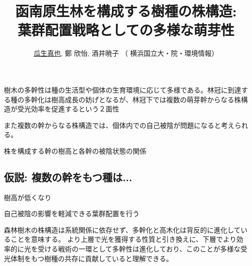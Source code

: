 \documentclass[a0, 36pt, plainboxedsections]{sciposter} %
\title{\textcolor{Orange1}{函南原生林を構成する樹種の株構造:\\葉群配置戦略としての多様な萌芽性}}
\author{\faUser \hspace{0.02em} \underline{瓜生真也}, 鄭 欣怡, 酒井暁子 （\faUniv \hspace{0.02em} 横浜国立大・院・環境情報） \normalsize{\faEnvelope \hspace{0.02em} \textit{\fontspec{ComicSansMS}{suika1127@gmail.com}}}}
\begin{document}
\maketitle
\begin{multicols}{2}

\begin{mdframed}[style=section.frame]
  \centering\huge\textbf{}
\end{mdframed}

樹木の多幹性は種の生活型や個体の生育環境に応じて多様である。林冠に到達する種の多幹化は樹高成長の妨げとなるが、林冠下では複数の萌芽幹からなる株構造が受光効率を促進するという２面性

また複数の幹からなる株構造では、個体内での自己被陰が問題になると考えられる。

株を構成する幹の樹高と各幹の被陰状態の関係

\subsection*{仮説: 複数の幹をもつ種は...}

\begin{list}{}{\setlength{\itemindent}{1em}} %
 \item 樹高が低くなり
 \item 自己被陰の影響を軽減できる葉群配置を行う
\end{list}

\begin{mdframed}[style=conclusion.frame]
  \centering\huge\textbf{}
  
  \flushleft\normalsize{
  森林樹木の株構造は系統関係に依存せず、多幹化と高木化は背反的に進化していることを意味する。
  より上層で光を獲得する性質と引き換えに、下層でより効率的に光を受ける戦術の一環として多幹性は進化しており、このことが多様な受光体制をもつ樹種の共存に貢献していると理解できる。
  }
\end{mdframed}

\end{multicols}

\begin{mdframed}[style=section.frame]
  \centering\huge\textbf{}
\end{mdframed}
\end{document}
